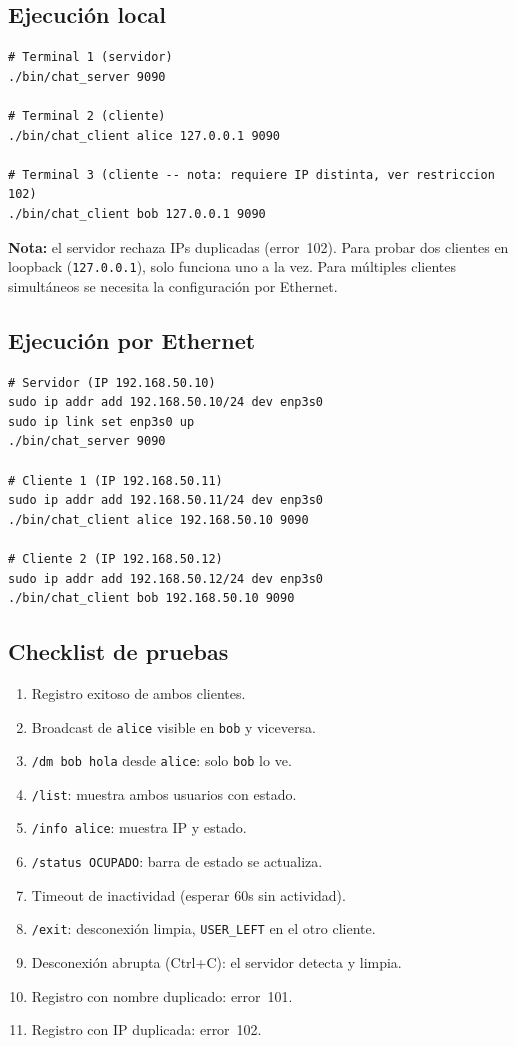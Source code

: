 \documentclass[12pt,a4paper]{article}
\begin{document}
\subsection{Ejecución local}

\begin{lstlisting}[style=protocol]
# Terminal 1 (servidor)
./bin/chat_server 9090

# Terminal 2 (cliente)
./bin/chat_client alice 127.0.0.1 9090

# Terminal 3 (cliente -- nota: requiere IP distinta, ver restriccion 102)
./bin/chat_client bob 127.0.0.1 9090
\end{lstlisting}

\textbf{Nota:} el servidor rechaza IPs duplicadas (error~102).  Para probar dos
clientes en loopback (\texttt{127.0.0.1}), solo funciona uno a la vez.  Para
múltiples clientes simultáneos se necesita la configuración por Ethernet.

\subsection{Ejecución por Ethernet}

\begin{lstlisting}[style=protocol]
# Servidor (IP 192.168.50.10)
sudo ip addr add 192.168.50.10/24 dev enp3s0
sudo ip link set enp3s0 up
./bin/chat_server 9090

# Cliente 1 (IP 192.168.50.11)
sudo ip addr add 192.168.50.11/24 dev enp3s0
./bin/chat_client alice 192.168.50.10 9090

# Cliente 2 (IP 192.168.50.12)
sudo ip addr add 192.168.50.12/24 dev enp3s0
./bin/chat_client bob 192.168.50.10 9090
\end{lstlisting}

\subsection{Checklist de pruebas}

\begin{enumerate}[nosep]
    \item Registro exitoso de ambos clientes.
    \item Broadcast de \texttt{alice} visible en \texttt{bob} y viceversa.
    \item \texttt{/dm bob hola} desde \texttt{alice}: solo \texttt{bob} lo ve.
    \item \texttt{/list}: muestra ambos usuarios con estado.
    \item \texttt{/info alice}: muestra IP y estado.
    \item \texttt{/status OCUPADO}: barra de estado se actualiza.
    \item Timeout de inactividad (esperar 60s sin actividad).
    \item \texttt{/exit}: desconexión limpia, \texttt{USER\_LEFT} en el otro cliente.
    \item Desconexión abrupta (Ctrl+C): el servidor detecta y limpia.
    \item Registro con nombre duplicado: error~101.
    \item Registro con IP duplicada: error~102.
\end{enumerate}
\end{document}
